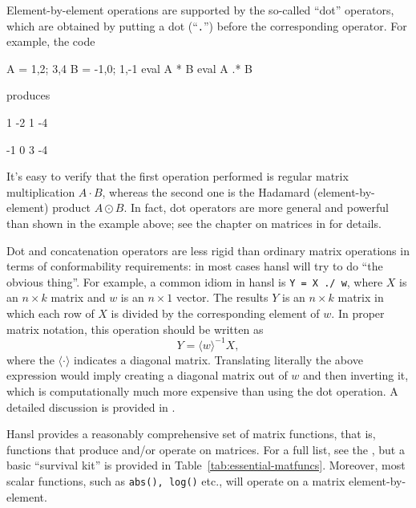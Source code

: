 Element-by-element operations are supported by the so-called ``dot''
operators, which are obtained by putting a dot (``\texttt{.}'') before
the corresponding operator. For example, the code
\begin{code}
A = {1,2; 3,4}
B = {-1,0; 1,-1}
eval A * B
eval A .* B
\end{code}
produces
\begin{code}
   1   -2 
   1   -4 

  -1    0 
   3   -4 
\end{code}

It's easy to verify that the first operation performed is regular
matrix multiplication $A \cdot B$, whereas the second one is the
Hadamard (element-by-element) product $A \odot B$. In fact, dot
operators are more general and powerful than shown in the example
above; see the chapter on matrices in \GUG{} for details.

Dot and concatenation operators are less rigid than ordinary matrix
operations in terms of conformability requirements: in most cases
hansl will try to do ``the obvious thing''. For example, a common
idiom in hansl is \texttt{Y = X ./ w}, where $X$ is an $n \times k$
matrix and $w$ is an $n \times 1$ vector. The results $Y$ is an $n
\times k$ matrix in which each row of $X$ is divided by the
corresponding element of $w$. In proper matrix notation, this
operation should be written as
\[
  Y = \langle w \rangle^{-1} X,
\]
where the $\langle \cdot \rangle$ indicates a diagonal
matrix. Translating literally the above expression would imply
creating a diagonal matrix out of $w$ and then inverting it, which is
computationally much more expensive than using the dot operation. A
detailed discussion is provided in \GUG.

Hansl provides a reasonably comprehensive set of matrix functions,
that is, functions that produce and/or operate on matrices. For a
full list, see the \GCR, but a basic ``survival kit'' is provided
in Table~\ref{tab:essential-matfuncs}.  Moreover, most scalar
functions, such as \texttt{abs(), log()} etc., will operate on a
matrix element-by-element.

